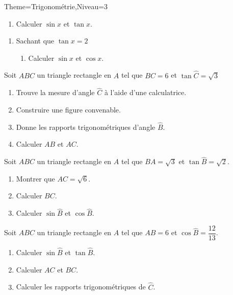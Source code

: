 \documentclass[a4paper,12pt]{article}
\begin{document}
\begin{Maquette}[Fiche]{Theme=Trigonométrie,Niveau=3}
\begin{exercice}
\begin{minipage}{.4\linewidth}
\begin{enumerate}[start=5]
\begin{enumerate}
\item Calculer $\sin x$ et $\tan x$.
\end{enumerate}
\end{enumerate}
\begin{enumerate}[start=6]
\item Sachant que $\tan x=2$
\begin{enumerate}
\item Calculer $\sin x$ et $\cos x$.
\end{enumerate}
\end{enumerate}
\end{minipage}
\end{exercice}

\begin{exercice}
Soit $ABC$ un triangle rectangle en $A$ tel que $BC=6$ et $\tan\widehat{C}=\sqrt{3}$
\begin{enumerate}
\item Trouve la mesure d'angle $\widehat{C}$ à l'aide d'une calculatrice.
\item Construire une figure convenable.
\item Donne les rapports trigonométriques d'angle $\widehat{B}$.
\item Calculer $AB$ et $AC$.
\end{enumerate}
\end{exercice}

\begin{minipage}{.5\linewidth}
\begin{exercice}
Soit $ABC$  un triangle rectangle en $A$ tel que $BA=\sqrt{3}$ et $\tan\widehat{B}=\sqrt{2}$.
\begin{enumerate}
\item Montrer que $AC=\sqrt{6}$.
\item Calculer $BC$.
\item Calculer $\sin\widehat{B}$ et $\cos\widehat{B}$.
\end{enumerate}
\end{exercice}
\end{minipage}%
\begin{minipage}{.5\linewidth}
\begin{exercice}
Soit $ABC$  un triangle rectangle en $A$ tel que $AB=6$ et $\cos\widehat{B}=\dfrac{12}{13}$.
\begin{enumerate}
\item Calculer $\sin\widehat{B}$ et $\tan\widehat{B}$.
\item Calculer $AC$ et $BC$.
\item Calculer les rapports trigonométriques de $\widehat{C}$.
\end{enumerate}
\end{exercice}
\end{minipage}


\end{Maquette}
\end{document}
